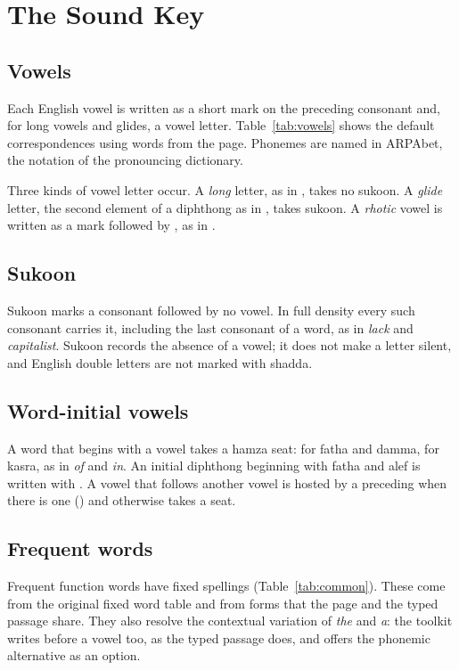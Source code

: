 \chapter{The Sound Key}

\section{Vowels}
Each English vowel is written as a short mark on the preceding consonant and, for long vowels and glides, a vowel letter. Table~\ref{tab:vowels} shows the default correspondences using words from the page. Phonemes are named in ARPAbet, the notation of the pronouncing dictionary.

\begin{table}[ht]\centering\small

\caption{Vowel key. The mark is the short vowel; the letters are the vowel letters added for long vowels and glides.}\label{tab:vowels}
\end{table}

Three kinds of vowel letter occur. A \emph{long} letter, as in , takes no sukoon. A \emph{glide} letter, the second element of a diphthong as in , takes sukoon. A \emph{rhotic} vowel is written as a mark followed by , as in .

\section{Sukoon}
Sukoon marks a consonant followed by no vowel. In full density every such consonant carries it, including the last consonant of a word, as in  \emph{lack} and  \emph{capitalist}. Sukoon records the absence of a vowel; it does not make a letter silent, and English double letters are not marked with shadda.

\section{Word-initial vowels}
A word that begins with a vowel takes a hamza seat:  for fatha and damma,  for kasra, as in  \emph{of} and  \emph{in}. An initial diphthong beginning with fatha and alef is written with . A vowel that follows another vowel is hosted by a preceding  when there is one () and otherwise takes a seat.

\section{Frequent words}
Frequent function words have fixed spellings (Table~\ref{tab:common}). These come from the original fixed word table and from forms that the page and the typed passage share. They also resolve the contextual variation of \emph{the} and \emph{a}: the toolkit writes  before a vowel too, as the typed passage does, and offers the phonemic alternative  as an option.

